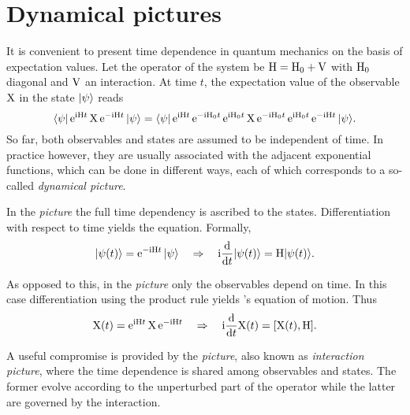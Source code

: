 \section{Dynamical pictures}

It is convenient to present time dependence in quantum mechanics on the basis of
expectation values. Let the  operator of the system be $\mathrm H =
\mathrm H_0 + \mathrm V$ with $\mathrm H_0$ diagonal and $\mathrm V$ an interaction. At time
$t$, the expectation value of the observable $\mathrm X$ in the state $|\psi\rangle$
reads
%
\begin{equation*}
    \langle\psi| \, \mathrm e^{\mathrm i \mathrm H t} \, \mathrm X \, \mathrm e^{-\mathrm i \mathrm H t} \, |\psi\rangle =
    \langle\psi| \, \mathrm e^{\mathrm i \mathrm H t} \, \mathrm e^{-\mathrm i \mathrm H_0 t} \,
    \mathrm e^{\mathrm i \mathrm H_0 t} \, \mathrm X \, \mathrm e^{-\mathrm i \mathrm H_0 t} \,
    \mathrm e^{\mathrm i \mathrm H_0 t} \, \mathrm e^{-\mathrm i \mathrm H t} \, |\psi\rangle.
\end{equation*}
%
So far, both observables and states are assumed to be independent of time. In
practice however, they are usually associated with the adjacent exponential
functions, which can be done in different ways, each of which corresponds to a
so-called \emph{dynamical picture}.

In the \emph{ picture} the full time dependency is ascribed to
the states. Differentiation with respect to time yields the 
equation. Formally,
%
\begin{equation*}
    |\psi(t)\rangle = \mathrm e^{-\mathrm i \mathrm H t} \, |\psi\rangle
    \quad \Rightarrow \quad
    \mathrm i \frac {\mathrm d} {\mathrm d t} |\psi(t)\rangle = \mathrm H |\psi(t)\rangle.
\end{equation*}

As opposed to this, in the \emph{ picture} only the observables
depend on time. In this case differentiation using the product rule yields
's equation of motion. Thus
%
\begin{equation*}
    \mathrm X(t) = \mathrm e^{\mathrm i \mathrm H t} \, \mathrm X \, \mathrm e^{-\mathrm i \mathrm H t}
    \quad \Rightarrow \quad
    \mathrm i \frac {\mathrm d} {\mathrm d t} \mathrm X(t) = [\mathrm X(t), \mathrm H].
\end{equation*}

A useful compromise is provided by the \emph{ picture}, also known
as \emph{interaction picture}, where the time dependence is shared among
observables and states. The former evolve according to the unperturbed part of
the  operator while the latter are governed by the interaction.


